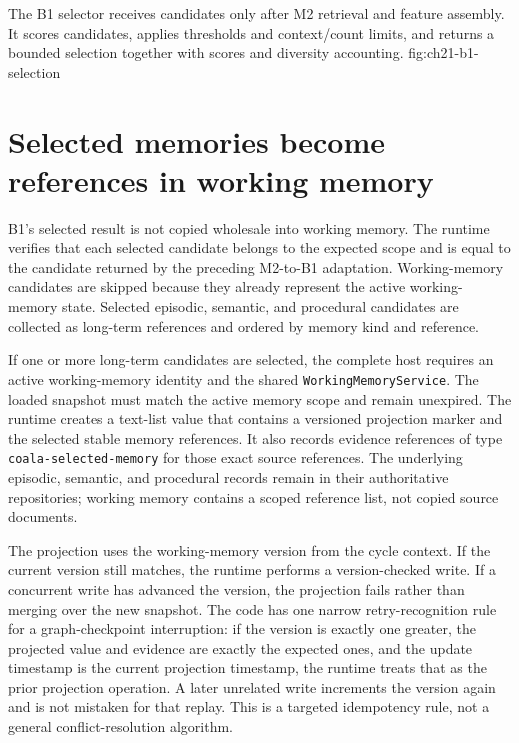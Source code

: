   {The B1 selector receives candidates only after M2 retrieval and feature assembly. It scores candidates, applies thresholds and context/count limits, and returns a bounded selection together with scores and diversity accounting.}
  {fig:ch21-b1-selection}

\section{Selected memories become references in working memory}
\label{sec:ch21-projection}

B1's selected result is not copied wholesale into working memory. The runtime verifies that each selected candidate belongs to the expected scope and is equal to the candidate returned by the preceding M2-to-B1 adaptation. Working-memory candidates are skipped because they already represent the active working-memory state. Selected episodic, semantic, and procedural candidates are collected as long-term references and ordered by memory kind and reference.

If one or more long-term candidates are selected, the complete host requires an active working-memory identity and the shared \texttt{Working\allowbreak{}Memory\allowbreak{}Service}. The loaded snapshot must match the active memory scope and remain unexpired. The runtime creates a text-list value that contains a versioned projection marker and the selected stable memory references. It also records evidence references of type \texttt{coala-\allowbreak{}selected-\allowbreak{}memory} for those exact source references. The underlying episodic, semantic, and procedural records remain in their authoritative repositories; working memory contains a scoped reference list, not copied source documents.

The projection uses the working-memory version from the cycle context. If the current version still matches, the runtime performs a version-checked write. If a concurrent write has advanced the version, the projection fails rather than merging over the new snapshot. The code has one narrow retry-recognition rule for a graph-checkpoint interruption: if the version is exactly one greater, the projected value and evidence are exactly the expected ones, and the update timestamp is the current projection timestamp, the runtime treats that as the prior projection operation. A later unrelated write increments the version again and is not mistaken for that replay. This is a targeted idempotency rule, not a general conflict-resolution algorithm.

